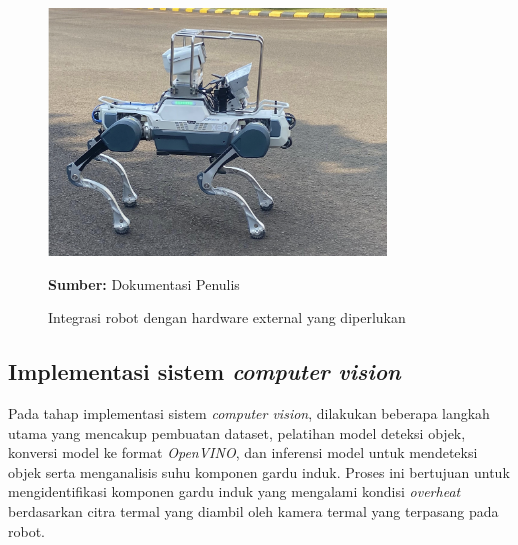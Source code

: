 \begin{figure}[H]
  \centering
  \includegraphics[width=0.8\textwidth]{gambar/bab3/impl-elec2.png}
  \caption{Integrasi robot dengan hardware external yang diperlukan}
  \label{fig:sistem-elec-robot}
  \footnotesize{\textbf{Sumber:} Dokumentasi Penulis}
\end{figure}

\subsection{Implementasi sistem \emph{computer vision}}
Pada tahap implementasi sistem \emph{computer vision}, dilakukan beberapa langkah utama yang mencakup pembuatan dataset, pelatihan model deteksi objek, konversi model ke format \emph{OpenVINO}, dan inferensi model untuk mendeteksi objek serta menganalisis suhu komponen gardu induk. Proses ini bertujuan untuk mengidentifikasi komponen gardu induk yang mengalami kondisi \emph{overheat} berdasarkan citra termal yang diambil oleh kamera termal yang terpasang pada robot.


